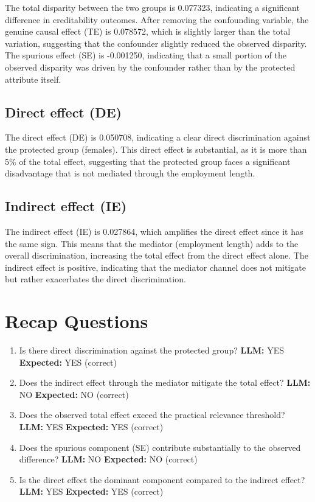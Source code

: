 \documentclass[11pt]{article}
\begin{document}
The total disparity between the two groups is 0.077323, indicating a significant difference in creditability outcomes. After removing the confounding variable, the genuine causal effect (TE) is 0.078572, which is slightly larger than the total variation, suggesting that the confounder slightly reduced the observed disparity. The spurious effect (SE) is -0.001250, indicating that a small portion of the observed disparity was driven by the confounder rather than by the protected attribute itself.

\subsection{Direct effect (DE)}

The direct effect (DE) is 0.050708, indicating a clear direct discrimination against the protected group (females). This direct effect is substantial, as it is more than 5\% of the total effect, suggesting that the protected group faces a significant disadvantage that is not mediated through the employment length.

\subsection{Indirect effect (IE)}

The indirect effect (IE) is 0.027864, which amplifies the direct effect since it has the same sign. This means that the mediator (employment length) adds to the overall discrimination, increasing the total effect from the direct effect alone. The indirect effect is positive, indicating that the mediator channel does not mitigate but rather exacerbates the direct discrimination.

\section{Recap Questions}

\begin{enumerate}
\item Is there direct discrimination against the protected group? \textbf{LLM:} YES \quad \textbf{Expected:} YES \quad (correct)
\item Does the indirect effect through the mediator mitigate the total effect? \textbf{LLM:} NO \quad \textbf{Expected:} NO \quad (correct)
\item Does the observed total effect exceed the practical relevance threshold? \textbf{LLM:} YES \quad \textbf{Expected:} YES \quad (correct)
\item Does the spurious component (SE) contribute substantially to the observed difference? \textbf{LLM:} NO \quad \textbf{Expected:} NO \quad (correct)
\item Is the direct effect the dominant component compared to the indirect effect? \textbf{LLM:} YES \quad \textbf{Expected:} YES \quad (correct)
\end{enumerate}
\end{document}
